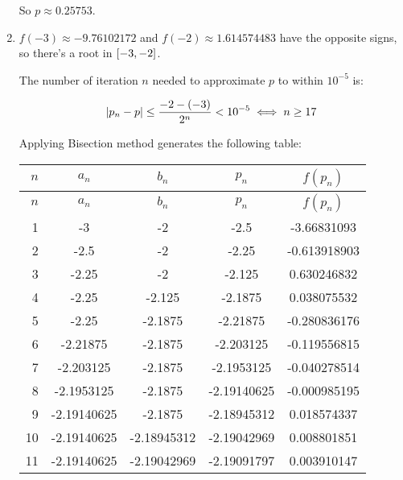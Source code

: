 \documentclass[../../../../Assignments.tex]{subfiles}
\begin{document}
\begin{solution}
\begin{enumerate}[label = (\alph*)]
            So \(p \approx \num{0.25753}\).

        \item \(f(-3) \approx \num{-9.76102172}\) and \(f(-2) \approx
            \num{1.614574483}\) have the opposite signs, so there's a root in
            \(\interval{-3}{-2}\).

            The number of iteration \(n\) needed to approximate \(p\) to within
            \(10^{-5}\) is:

            \[\abs{p_n - p} \leq \frac{-2 - (-3)}{2^n} < 10^{-5} \iff n \geq 17\]

            Applying Bisection method generates the following table:

            \begin{longtable}{r S[table-format=-1.8] S[table-format=-1.8] S[table-format=-1.8] S[table-format=-1.9]}
                \toprule
                \(n\)  &   {\(a_n\)}   &   {\(b_n\)}   &   {\(p_n\)}   &  {\(f(p_n)\)}  \\
                \midrule
                \endfirsthead
                \(n\)  &   {\(a_n\)}   &   {\(b_n\)}   &   {\(p_n\)}   &  {\(f(p_n)\)}  \\
                \midrule
                  &  -3           &  -2           &  -2.5         &  -3.66831093   \\
                    2  &  -2.5         &  -2           &  -2.25        &  -0.613918903  \\
                    3  &  -2.25        &  -2           &  -2.125       &   0.630246832  \\
                    4  &  -2.25        &  -2.125       &  -2.1875      &   0.038075532  \\
                    5  &  -2.25        &  -2.1875      &  -2.21875     &  -0.280836176  \\
                    6  &  -2.21875     &  -2.1875      &  -2.203125    &  -0.119556815  \\
                    7  &  -2.203125    &  -2.1875      &  -2.1953125   &  -0.040278514  \\
                    8  &  -2.1953125   &  -2.1875      &  -2.19140625  &  -0.000985195  \\
                    9  &  -2.19140625  &  -2.1875      &  -2.18945312  &   0.018574337  \\
                   10  &  -2.19140625  &  -2.18945312  &  -2.19042969  &   0.008801851  \\
                   11  &  -2.19140625  &  -2.19042969  &  -2.19091797  &   0.003910147  \\

\end{longtable}
\end{enumerate}
\end{solution}
\end{document}
